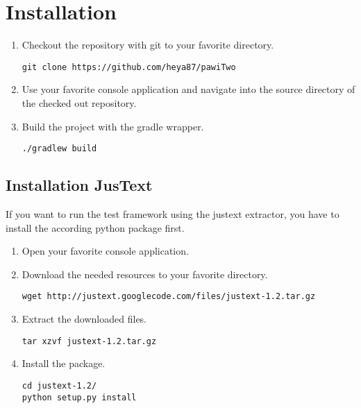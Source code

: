 \section{Installation}

\begin{enumerate}

\item Checkout the repository with git to your favorite directory.
\begin{lstlisting}
git clone https://github.com/heya87/pawiTwo
\end{lstlisting}


\item Use your favorite console application and navigate into the source directory of the checked out repository.

\item Build the project with the gradle wrapper.
\begin{lstlisting}
./gradlew build
\end{lstlisting}

\end{enumerate}


\subsection{Installation JusText}
\label{userManual:InstallationJusText}
If you want to run the test framework using the justext extractor, you have to install the according python package first.

\begin{enumerate}
\item Open your favorite console application.
\item Download the needed resources to your favorite directory.
\begin{lstlisting}
wget http://justext.googlecode.com/files/justext-1.2.tar.gz
\end{lstlisting}

\item Extract the downloaded files.
\begin{lstlisting}
tar xzvf justext-1.2.tar.gz
\end{lstlisting}


\item Install the package.
\begin{lstlisting}
cd justext-1.2/
python setup.py install
\end{lstlisting}





\end{enumerate}


